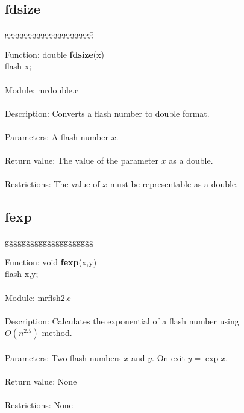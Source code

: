 \subsection{fdsize}

\begin{tabbing}
ggggggggggggggggggggg\= \kill


      Function:      \>double {\bf fdsize}(x) \\
                     \>flash x; \\
      \ \\
      Module:        \>mrdouble.c \\
      \ \\
      Description:   \>Converts a flash number to double format. \\
      \ \\
      Parameters:    \>A flash number $x$. \\
      \ \\
      Return value:  \>The value of the parameter $x$ as a double. \\
      \ \\
      Restrictions:  \>The value of $x$ must be representable as a double.\\

\end{tabbing}

\subsection{fexp}

\begin{tabbing}
ggggggggggggggggggggg\= \kill

      Function:      \>void {\bf fexp}(x,y) \\
                     \>flash x,y; \\
      \ \\
      Module:        \>mrflsh2.c \\
      \ \\
      Description:   \>Calculates the exponential of a flash number using \\
                     \>$O(n^{2.5})$ method. \\
      \ \\
      Parameters:    \>Two flash numbers $x$ and $y$. On exit $y=\exp x$. \\
      \ \\
      Return value:  \>None \\
      \ \\
      Restrictions:  \>None \\

\end{tabbing}
\pagebreak
